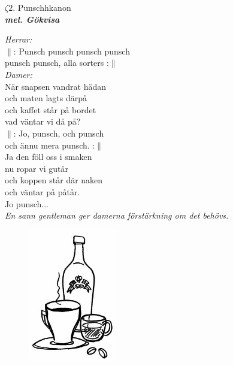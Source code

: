 \documentclass[a6paper,10pt]{article}
\newcommand{\mel}[1]{\small\textbf{\textit{mel. #1 \\}}}
\begin{document}
\setlength{\oddsidemargin}{-0.47in}
\noindent
\begin{center}
\Large $\zeta2$. Punschhkanon \\ 
\mel{Gökvisa}
\end{center}
\textit{Herrar:}
\vspace{4pt}\\
$\|$: Punsch punsch punsch punsch\\
punsch punsch, alla sorters :$\|$
\vspace{5pt}\\
\textit{Damer:}
\vspace{4pt}\\
När snapsen vandrat hädan\\
och maten lagts därpå\\
och kaffet står på bordet\\
vad väntar vi då på?
\vspace{5pt}\\
$\|$: Jo, punsch, och punsch\\
och ännu mera punsch. :$\|$
\vspace{5pt}\\
Ja den föll oss i smaken \\
nu ropar vi gutår\\
och koppen står där naken\\
och väntar på påtår.
\vspace{5pt}\\
Jo punsch...
\vspace{10pt}\\
\textit{En sann gentleman ger damerna förstärkning om det behövs.}
\begin{figure}[!h]
\centering
\includegraphics[width=0.35\textwidth]{kaffe.jpg}
\end{figure}
\end{document}
